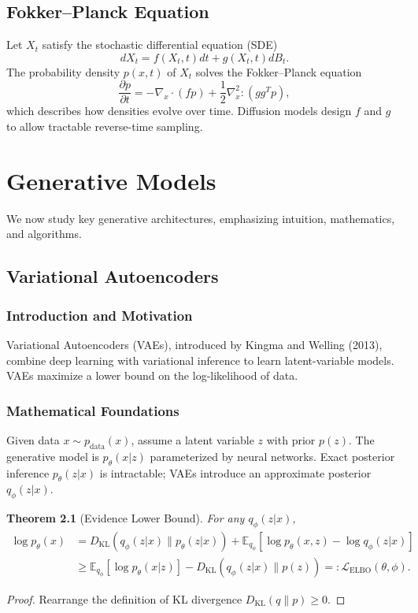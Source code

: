 \documentclass[11pt]{book}
\newtheorem{theorem}{Theorem}[chapter]
\begin{document}
\section{Fokker--Planck Equation}
Let $X_t$ satisfy the stochastic differential equation (SDE)
\begin{equation}
dX_t = f(X_t,t) dt + g(X_t,t) dB_t.
\end{equation}
The probability density $p(x,t)$ of $X_t$ solves the Fokker--Planck equation
\begin{equation}
\frac{\partial p}{\partial t} = -\nabla_x\cdot (f p) + \frac{1}{2}\nabla_x^2:(gg^T p),
\end{equation}
which describes how densities evolve over time. Diffusion models design $f$ and $g$ to allow tractable reverse-time sampling.

\chapter{Generative Models}
We now study key generative architectures, emphasizing intuition, mathematics, and algorithms.

\section{Variational Autoencoders}
\subsection{Introduction and Motivation}
Variational Autoencoders (VAEs), introduced by Kingma and Welling (2013), combine deep learning with variational inference to learn latent-variable models. VAEs maximize a lower bound on the log-likelihood of data.

\subsection{Mathematical Foundations}
Given data $x\sim p_\text{data}(x)$, assume a latent variable $z$ with prior $p(z)$. The generative model is $p_\theta(x|z)$ parameterized by neural networks. Exact posterior inference $p_\theta(z|x)$ is intractable; VAEs introduce an approximate posterior $q_\phi(z|x)$.

\begin{theorem}[Evidence Lower Bound]
For any $q_\phi(z|x)$,
\begin{align}
\log p_\theta(x) &= D_{\mathrm{KL}}(q_\phi(z|x)\|p_\theta(z|x)) + \mathbb{E}_{q_\phi} [\log p_\theta(x,z) - \log q_\phi(z|x)] \\
&\ge \mathbb{E}_{q_\phi} [\log p_\theta(x|z)] - D_{\mathrm{KL}}(q_\phi(z|x)\|p(z)) =: \mathcal{L}_{\text{ELBO}}(\theta,\phi).
\end{align}
\end{theorem}
\begin{proof}
Rearrange the definition of KL divergence $D_{\mathrm{KL}}(q\|p)\ge0$.
\end{proof}
\end{document}
